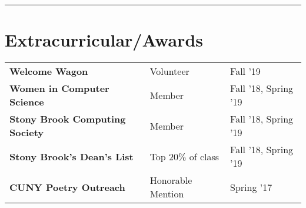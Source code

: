 \documentclass[]{deedy-resume-openfont}
\begin{document}
\noindent\rule{\textwidth}{0.4pt}
\section{Extracurricular/Awards} 
\begin{tabular}{>{\bfseries}lll}
Welcome Wagon & Volunteer & Fall '19\\
Women in Computer Science & Member & Fall '18, Spring '19\\
Stony Brook Computing Society & Member & Fall '18, Spring '19\\
Stony Brook's Dean's List & Top 20\% of class & Fall '18, Spring '19\\
CUNY Poetry Outreach & Honorable Mention & Spring '17\\
\end{tabular}
\sectionsep
\end{document}
